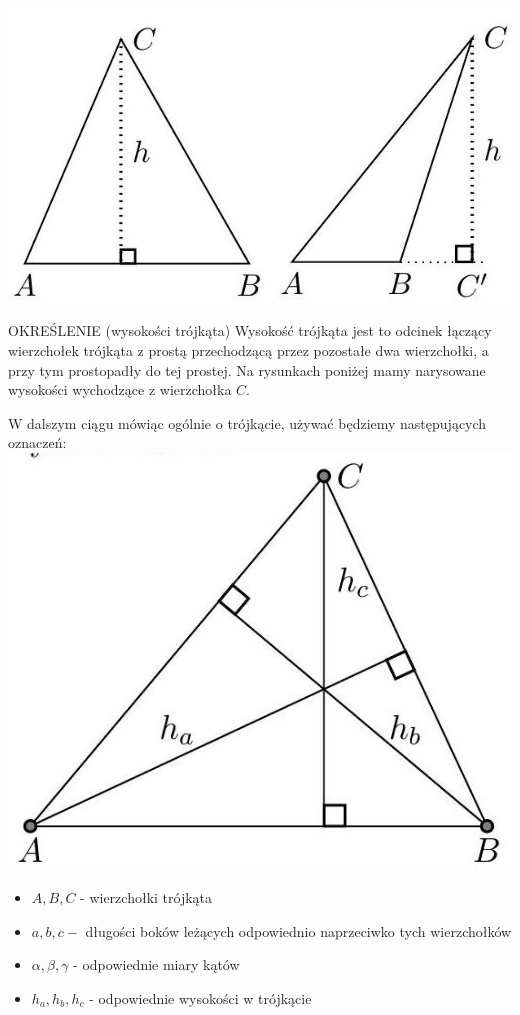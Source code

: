 \documentclass[10pt]{article}
\begin{document}
\includegraphics[max width=\textwidth, center]{2024_11_21_8f01584889ff06348ae7g-196(1)}

OKREŚLENIE (wysokości trójkąta) Wysokość trójkąta jest to odcinek łączący wierzchołek trójkąta z prostą przechodzącą przez pozostałe dwa wierzchołki, a przy tym prostopadły do tej prostej. Na rysunkach poniżej mamy narysowane wysokości wychodzące z wierzchołka \(C\).

W dalszym ciągu mówiąc ogólnie o trójkącie, używać będziemy następujących oznaczeń:\\
\includegraphics[max width=\textwidth, center]{2024_11_21_8f01584889ff06348ae7g-196}

\begin{itemize}
  \item \(A, B, C\) - wierzchołki trójkąta
  \item \(a, b, c-\) długości boków leżących odpowiednio naprzeciwko tych wierzchołków
  \item \(\alpha, \beta, \gamma\) - odpowiednie miary kątów
  \item \(h_{a}, h_{b}, h_{c}\) - odpowiednie wysokości w trójkącie
\end{itemize}
\end{document}
